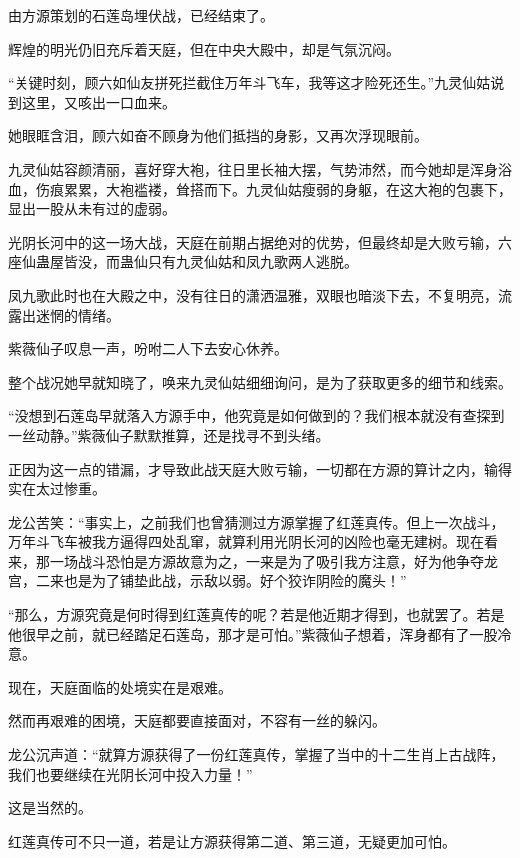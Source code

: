 
\begin{this_body}



由方源策划的石莲岛埋伏战，已经结束了。

辉煌的明光仍旧充斥着天庭，但在中央大殿中，却是气氛沉闷。

“关键时刻，顾六如仙友拼死拦截住万年斗飞车，我等这才险死还生。”九灵仙姑说到这里，又咳出一口血来。

她眼眶含泪，顾六如奋不顾身为他们抵挡的身影，又再次浮现眼前。

九灵仙姑容颜清丽，喜好穿大袍，往日里长袖大摆，气势沛然，而今她却是浑身浴血，伤痕累累，大袍褴褛，耸搭而下。九灵仙姑瘦弱的身躯，在这大袍的包裹下，显出一股从未有过的虚弱。

光阴长河中的这一场大战，天庭在前期占据绝对的优势，但最终却是大败亏输，六座仙蛊屋皆没，而蛊仙只有九灵仙姑和凤九歌两人逃脱。

凤九歌此时也在大殿之中，没有往日的潇洒温雅，双眼也暗淡下去，不复明亮，流露出迷惘的情绪。

紫薇仙子叹息一声，吩咐二人下去安心休养。

整个战况她早就知晓了，唤来九灵仙姑细细询问，是为了获取更多的细节和线索。

“没想到石莲岛早就落入方源手中，他究竟是如何做到的？我们根本就没有查探到一丝动静。”紫薇仙子默默推算，还是找寻不到头绪。

正因为这一点的错漏，才导致此战天庭大败亏输，一切都在方源的算计之内，输得实在太过惨重。

龙公苦笑：“事实上，之前我们也曾猜测过方源掌握了红莲真传。但上一次战斗，万年斗飞车被我方逼得四处乱窜，就算利用光阴长河的凶险也毫无建树。现在看来，那一场战斗恐怕是方源故意为之，一来是为了吸引我方注意，好为他争夺龙宫，二来也是为了铺垫此战，示敌以弱。好个狡诈阴险的魔头！”

“那么，方源究竟是何时得到红莲真传的呢？若是他近期才得到，也就罢了。若是他很早之前，就已经踏足石莲岛，那才是可怕。”紫薇仙子想着，浑身都有了一股冷意。

现在，天庭面临的处境实在是艰难。

然而再艰难的困境，天庭都要直接面对，不容有一丝的躲闪。

龙公沉声道：“就算方源获得了一份红莲真传，掌握了当中的十二生肖上古战阵，我们也要继续在光阴长河中投入力量！”

这是当然的。

红莲真传可不只一道，若是让方源获得第二道、第三道，无疑更加可怕。


\end{this_body}
